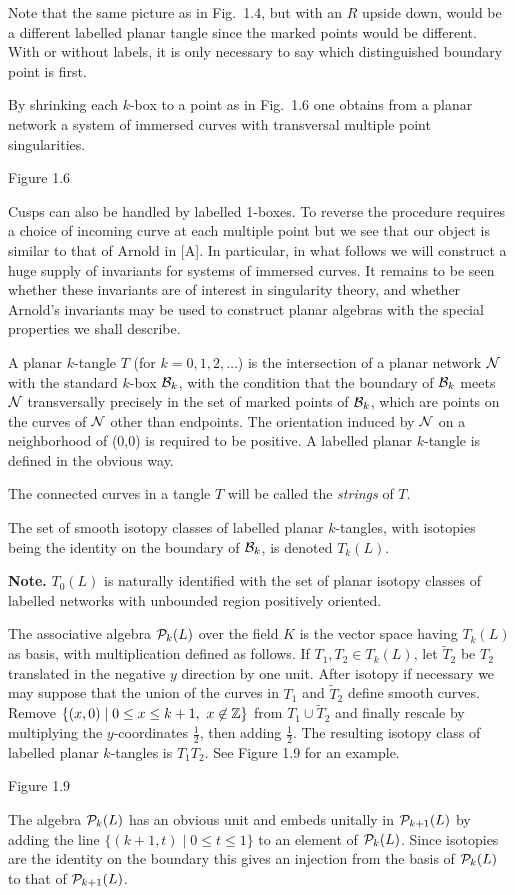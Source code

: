 \bs\ni
Note that the same picture as in Fig.~1.4, but with an $R$ upside
down, would be a different labelled planar tangle since the marked
points would be different.
With or without labels, it is only  necessary to say which
distinguished boundary point is first. 

 By shrinking each $k$-box to a point as in
Fig.~1.6 one obtains from a planar network a system of immersed
curves with transversal multiple point singularities.
\[
        
\]
\begin{center}
Figure 1.6
\end{center}
\ni
Cusps can also be handled by labelled 1-boxes. To reverse the
procedure requires a choice of incoming curve at each multiple
point but we see that our object is similar to that of Arnold in
[A]. In particular, in what follows we will construct a huge
supply of invariants for systems of immersed curves. It remains to
be seen whether these invariants are of interest in singularity
theory, and whether Arnold's invariants may be used to construct
planar algebras with the special properties we shall describe.

 A planar $k$-tangle $T$ (for
$k=0,1,2,\dots$) is the intersection of a planar network $\cal N$
with the standard $k$-box $\b_k$, with the condition that the
boundary of $\b_k$ meets $\cal N$ transversally precisely in the
set of marked points of $\b_k$, which are points on the curves of
$\cal N$ other than endpoints. The orientation induced by $\cal N$
on a neighborhood of (0,0) is required to be positive. A labelled
planar $k$-tangle is defined in the obvious way.

The connected curves in a tangle $T$ will be called the {\it
strings} of $T$. 

The set of smooth isotopy classes of labelled planar $k$-tangles,
with isotopies being the identity on the boundary of $\b_k$, is
denoted $T_k(L)$.

{\bf Note.} $T_0(L)$ is naturally identified with the set of planar
isotopy classes of labelled networks with unbounded region
positively oriented.

 The associative algebra
$\P_k(L)$ over the field $K$ is the vector space having $T_k(L)$ as
basis, with multiplication defined as follows. If $T_1,T_2\in
T_k(L)$, let
$\tilde T_2$ be $T_2$ translated in the negative $y$ direction by
one unit. After isotopy if necessary we may suppose that the union
of the curves in $T_1$ and $\tilde T_2$ define smooth curves.
Remove  $\{(x,0)\mid 0\leq x\leq k+1, \ x\not\in\z\}$ from
$T_1\cup\tilde T_2$ and finally rescale by multiplying the
$y$-coordinates $\frac 12$, then adding $\frac 12$.
The resulting isotopy class of labelled planar $k$-tangles is
$T_1T_2$. See Figure 1.9 for an example.
\[
        
\]
\begin{center}
        Figure 1.9
\end{center}
 The algebra $\P_k(L)$ has an obvious unit and
embeds unitally in $\P_{k+1}(L)$ by adding the line
$\{(k+1,t)\mid 0\leq t\leq 1\}$ to an element of $\P_k(L)$.
Since isotopies are the identity on the boundary this gives an
injection from the basis of $\P_{k}(L)$ to that of
$\P_{k+1}(L)$.

